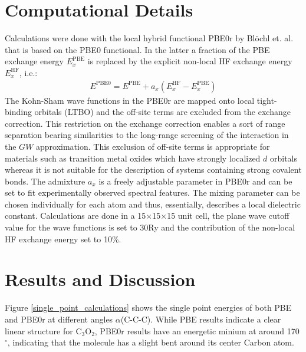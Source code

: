 \documentclass[%
 reprint,
nofootinbib,
 amsmath,amssymb,
 aps,
]{revtex4-2}
\begin{document}
\section{\label{computational_details}Computational Details}
Calculations were done with the local hybrid functional PBE0r by Blöchl et. al. \cite{BloechlLocal} that is based on the PBE0 \cite{PBE0} functional. In the latter a fraction of the PBE exchange energy $E_x^{\text{PBE}}$ is replaced by the explicit non-local HF exchange energy $E_x^{\text{HF}}$, i.e.:
\begin{eqnarray}
E^{\text{PBE0}}=E^{\text{PBE}} + a_x(E_x^{\text{HF}}-E_x^{\text{PBE}})
\end{eqnarray}
The Kohn-Sham wave functions in the PBE0r are mapped onto local tight-binding orbitals (LTBO) and the off-site terms are excluded from the exchange correction. This restriction on the exchange correction enables a sort of range separation bearing similarities to the long-range screening of the interaction in the $GW$ approximation. 
This exclusion of off-site terms is appropriate for materials such as transition metal oxides which have strongly localized $d$ orbitals whereas it is not suitable for the description of systems containing strong covalent bonds. \cite{BloechlLocal}
The admixture $a_x$\cite{PerdewPBE0, BloechlLocal} is a freely adjustable parameter in PBE0r and can be set to fit experimentally observed spectral features. The mixing parameter can be chosen individually for each atom and thus, essentially, describes a local dielectric constant. 
Calculations are done in a 15$\times$15$\times$15 unit cell, the plane wave cutoff value for the wave functions is set to 30Ry and the contribution of the non-local HF exchange energy set to 10\%.


\section{\label{results}Results and Discussion}

Figure \ref{single_point_calculations} shows the single point energies of both PBE and PBE0r at different angles $\alpha$(C-C-C). 
While PBE results indicate a clear linear structure for C$_3$O$_2$, PBE0r results have an energetic minium  at around 170$^\circ$, indicating that the molecule has a slight bent around its center Carbon atom.
\end{document}
